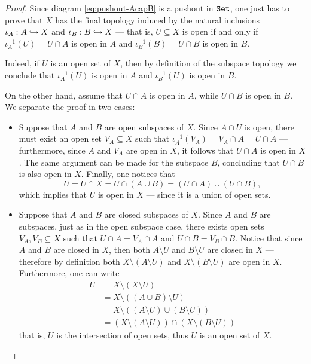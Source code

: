 \begin{proof}
Since diagram \cref{eq:pushout-AcapB} is a pushout in \({\texttt{Set}}\), one just has to
prove that \(X\) has the final topology induced by the natural inclusions
\(\iota_A: A \hookrightarrow X\) and \(\iota_B: B \hookrightarrow X\) --- that is, \(U \subseteq X\)
is open if and only if \(\iota_A^{-1}(U) = U \cap A\) is open in \(A\) and
\(\iota_B^{-1}(B) = U \cap B\) is open in \(B\).

Indeed, if \(U\) is an open set of \(X\), then by definition of the subspace
topology we conclude that \(\iota_A^{-1}(U)\) is open in \(A\) and
\(\iota_B^{-1}(U)\) is open in \(B\).

On the other hand, assume that \(U \cap A\) is open in \(A\), while \(U \cap B\)
is open in \(B\). We separate the proof in two cases:
\begin{itemize}\setlength\itemsep{0em}
\item Suppose that \(A\) and \(B\) are open subspaces of \(X\). Since \(A \cap
  U\) is open, there must exist an open set \(V_A \subseteq X\) such that
  \(\iota_A^{-1}(V_A) = V_A \cap A = U \cap A\) --- furthermore, since \(A\) and
  \(V_A\) are open in \(X\), it follows that \(U \cap A\) is open in \(X\). The
  same argument can be made for the subspace \(B\), concluding that \(U \cap B\)
  is also open in \(X\). Finally, one notices that
  \[
  U = U \cap X = U \cap (A \cup B) = (U \cap A) \cup (U \cap B),
  \]
  which implies that \(U\) is open in \(X\) --- since it is a union of open
  sets.

\item Suppose that \(A\) and \(B\) are closed subspaces of \(X\). Since \(A\)
  and \(B\) are subspaces, just as in the open subspace case, there exists open
  sets \(V_A, V_B \subseteq X\) such that \(U \cap A = V_A \cap A\) and
  \(U \cap B = V_B \cap B\). Notice that since \(A\) and \(B\) are closed in
  \(X\), then both \(A \setminus U\) and \(B \setminus U\) are closed in \(X\)
  --- therefore by definition both \(X \setminus (A \setminus U)\) and \(X
  \setminus (B \setminus U)\) are open in \(X\). Furthermore, one can write
  \begin{align*}
    U &= X \setminus (X \setminus U) \\
    &= X \setminus ((A \cup B) \setminus U) \\
    &= X \setminus ((A \setminus U) \cup (B \setminus U)) \\
    &= (X \setminus (A \setminus U)) \cap (X \setminus (B \setminus U))
  \end{align*}
  that is, \(U\) is the intersection of open sets, thus \(U\) is an open set of
  \(X\).
\end{itemize}
\end{proof}

